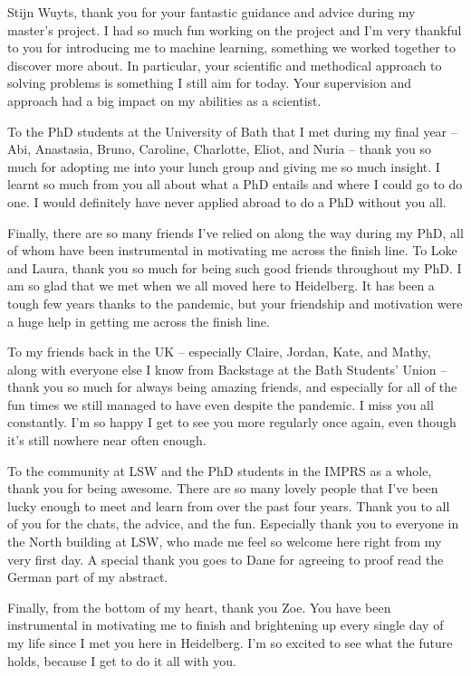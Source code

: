 Stijn Wuyts, thank you for your fantastic guidance and advice during my master's project. I had so much fun working on the project and I'm very thankful to you for introducing me to machine learning, something we worked together to discover more about. In particular, your scientific and methodical approach to solving problems is something I still aim for today. Your supervision and approach had a big impact on my abilities as a scientist.

To the PhD students at the University of Bath that I met during my final year -- Abi, Anastasia, Bruno, Caroline, Charlotte, Eliot, and Nuria -- thank you so much for adopting me into your lunch group and giving me so much insight. I learnt so much from you all about what a PhD entails and where I could go to do one. I would definitely have never applied abroad to do a PhD without you all.

Finally, there are so many friends I've relied on along the way during my PhD, all of whom have been instrumental in motivating me across the finish line. To Loke and Laura, thank you so much for being such good friends throughout my PhD. I am so glad that we met when we all moved here to Heidelberg. It has been a tough few years thanks to the pandemic, but your friendship and motivation were a huge help in getting me across the finish line.

To my friends back in the UK -- especially Claire, Jordan, Kate, and Mathy, along with everyone else I know from Backstage at the Bath Students' Union -- thank you so much for always being amazing friends, and especially for all of the fun times we still managed to have even despite the pandemic. I miss you all constantly. I'm so happy I get to see you more regularly once again, even though it's still nowhere near often enough.

To the community at LSW and the PhD students in the IMPRS as a whole, thank you for being awesome. There are so many lovely people that I've been lucky enough to meet and learn from over the past four years. Thank you to all of you for the chats, the advice, and the fun. Especially thank you to everyone in the North building at LSW, who made me feel so welcome here right from my very first day. A special thank you goes to Dane for agreeing to proof read the German part of my abstract.

Finally, from the bottom of my heart, thank you Zoe. You have been instrumental in motivating me to finish and brightening up every single day of my life since I met you here in Heidelberg. I'm so excited to see what the future holds, because I get to do it all with you.
